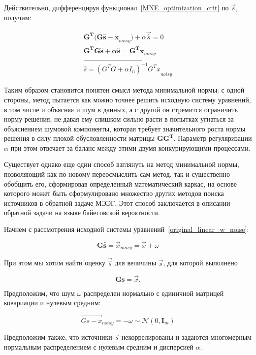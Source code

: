 Действительно, дифференцируя функционал~\ref{MNE_optimization_crit} по $\vec{s}$,
получим:

\begin{gather*}
    \mathbf{G^T(G\hat{s} - x}_{noisy}) + \alpha\vec{\hat{s}} = 0\\
    \mathbf{G^TG\hat{s} + \alpha \hat{s} = G^Tx}_{noisy}\\
    \vec{\hat{s} = (G^TG + \alpha I_n)^{-1}G^Tx}_{noisy}
\end{gather*}


Таким образом становится понятен смысл метода минимальной нормы: с одной
стороны, метод пытается как можно точнее решить исходную систему уравнений, в
том числе и объясняя и шум в данных, а с другой он стремится ограничить норму
решения, не давая ему слишком сильно расти в попытках угнаться за объяснением
шумовой компоненты, которая требует значительного роста нормы решения в силу
плохой обусловленности матрицы $\mathbf{GG^T}$. Параметр регуляризации $\alpha$
при этом отвечает за баланс между этими двумя конкурирующими процессами.

Существует однако еще один способ взглянуть на метод минимальной нормы,
позволяющий как по-новому переосмыслить сам метод, так и существенно обобщить
его, сформировав определенный математический каркас, на основе которого
может быть сформулировано множество других методов поиска источников
в обратной задаче МЭЭГ. Этот способ заключается в описании обратной задачи
на языке байесовской вероятности.

Начнем с рассмотрения исходной системы уравнений~\ref{original_linear_w_noise}:

\begin{equation}
    \mathbf{G\hat{s}} = \vec{x}_{noisy} = \vec{x} + \omega
\end{equation}

При этом мы хотим найти оценку $\vec{\hat{s}}$ для величины $\vec{s}$,
для которой выполнено

\begin{equation}
    \mathbf{Gs} = \vec{x}.
\end{equation}

Предположим, что шум $\omega$ распределен нормально с единичной
матрицей ковариации и нулевым средним:

\begin{equation}
    \vec{Gs - x}_{noisy} = -\omega \sim \mathcal{N}(0, \mathbf{I}_m)
\end{equation}

Предположим также, что источники $\vec{s}$ некоррелированы и задаются
многомерным нормальным распределением с нулевым средним и дисперсией $\alpha$:

